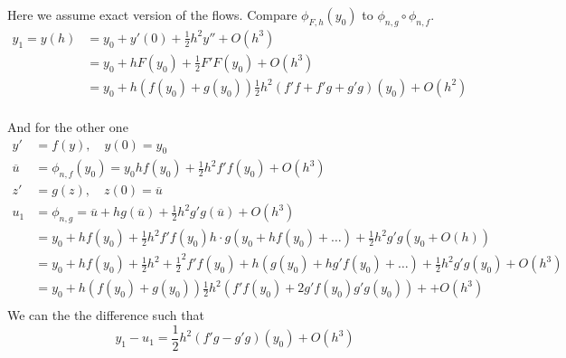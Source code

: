 \documentclass{article}
\theoremstyle{remark}
\begin{document}
Here we assume exact version of the flows. Compare
     $\phi _{F,h}\left( y_{0} \right) $ to   $\phi _{n,g} \circ \phi _{n,f}$.  \[
     \begin{split}
       y_{1} =  y\left( h \right)  & = y_{0} + y' \left( 0 \right) + \frac{1}{2} h^2 y''  + O\left( h^3 \right) \\
       &=  y_{0} + h F\left( y_{0} \right) + \frac{1}{2} F' F\left( y_{0} \right) + O\left( h^3 \right) \\
       &= y_{0} + h \left( f\left( y_{0} \right) + g\left( y_{0} \right) \right) \frac{1}{2} h^2 \left( f' f + f' g + g' g  \right)\left( y_{0} \right) + O\left( h^2 \right) \\
     \end{split} 
     \] 

     And for the other one \[
     \begin{split}
       y'  & = f\left( y \right) , \quad  y\left( 0 \right) = y_{0}  \\
       \overline{u} &= \phi _{n,f}\left( y_{0} \right) = y_{0} h f\left( y_{0} \right) + \frac{1}{2} h^2 f'  f\left( y_{0} \right) + O\left( h^3 \right) \\
       z'   & = g\left( z \right) , \quad  z\left( 0 \right) = \overline{u}   \\
       u_{1} &=  \phi _{n,g} = \overline{u}  + h g\left( \overline{u}  \right) + \frac{1}{2} h^2 g' g\left( \overline{u}  \right) + O\left( h^3 \right) \\
       &=  y_{0} + hf\left( y_{0} \right) + \frac{1}{2} h^2  f' f\left( y_{0} \right) h\cdot g\left( y_{0} + h f\left( y_{0} \right) + \ldots \right) + \frac{1}{2} h^2 g' g\left( y_{0} + O\left( h \right) \right)  \\ 
       &=  y_{0} + hf\left( y_{0} \right) + \frac{1}{2} h^2 + \frac{1}{2} ^2 f'  f\left( y_{0} \right) + h\left( g\left( y_{0} \right) + h g' f\left( y_{0} \right) + \ldots \right) + \frac{1}{2} h ^2 g'  g\left( y_{0} \right) + O\left( h^3 \right) \\
       &= y_{0} + h\left( f\left( y_{0} \right) + g\left( y_{0} \right) \right) \frac{1}{2} h^2 \left( f'  f\left( y_{0} \right) + 2 g' f\left( y_{0} \right) g' g\left( y_{0} \right) \right) +  +  O\left( h^3 \right)  \\
     \end{split} 
     \] 
     We can the the difference such that \[
     y_{1} - u_{1} = \frac{1}{2} h^2 \left( f' g - g' g \right)\left( y_{0} \right) + O\left( h^3 \right)
     \] 
\end{document}
